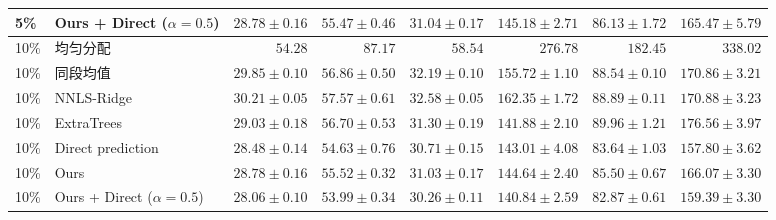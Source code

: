 \begin{table}[t]
\begin{tabular}{llrrrrrr}
5\% & Ours + Direct ($\alpha=0.5$) & $\mathbf{28.78\pm0.16}$ & $\mathbf{55.47\pm0.46}$ & $\mathbf{31.04\pm0.17}$ & $\mathbf{145.18\pm2.71}$ & $\mathbf{86.13\pm1.72}$ & $165.47\pm5.79$\\
\midrule
10\% & 均匀分配 & $54.28$ & $87.17$ & $58.54$ & $276.78$ & $182.45$ & $338.02$\\
10\% & 同段均值 & $29.85\pm0.10$ & $56.86\pm0.50$ & $32.19\pm0.10$ & $155.72\pm1.10$ & $88.54\pm0.10$ & $170.86\pm3.21$\\
10\% & NNLS-Ridge & $30.21\pm0.05$ & $57.57\pm0.61$ & $32.58\pm0.05$ & $162.35\pm1.72$ & $88.89\pm0.11$ & $170.88\pm3.23$\\
10\% & ExtraTrees & $29.03\pm0.18$ & $56.70\pm0.53$ & $31.30\pm0.19$ & $141.88\pm2.10$ & $89.96\pm1.21$ & $176.56\pm3.97$\\
10\% & Direct prediction & $28.48\pm0.14$ & $54.63\pm0.76$ & $30.71\pm0.15$ & $143.01\pm4.08$ & $83.64\pm1.03$ & $\mathbf{157.80\pm3.62}$\\
10\% & Ours & $28.78\pm0.16$ & $55.52\pm0.32$ & $31.03\pm0.17$ & $144.64\pm2.40$ & $85.50\pm0.67$ & $166.07\pm3.30$\\
10\% & Ours + Direct ($\alpha=0.5$) & $\mathbf{28.06\pm0.10}$ & $\mathbf{53.99\pm0.34}$ & $\mathbf{30.26\pm0.11}$ & $\mathbf{140.84\pm2.59}$ & $\mathbf{82.87\pm0.61}$ & $159.39\pm3.30$\\
\bottomrule\end{tabular}
\end{table}
